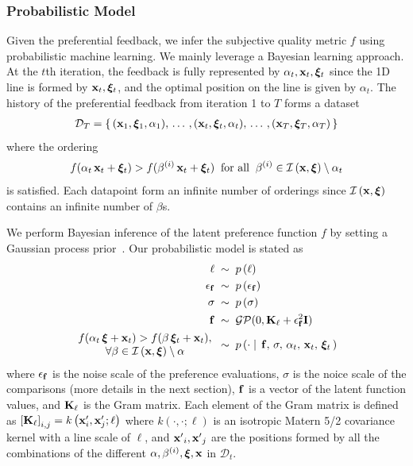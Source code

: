 \subsubsection{Probabilistic Model}
Given the preferential feedback, we infer the subjective quality metric \(f\) using probabilistic machine learning.
We mainly leverage a Bayesian learning approach.
At the \(t\)th iteration, the feedback is fully represented by \(\alpha_t, \mathbf{x}_t, \bm{\xi}_t\) since the 1D line is formed by \(\mathbf{x}_t, \bm{\xi}_t\), and the optimal position on the line is given by \(\alpha_t\).
The history of the preferential feedback from iteration 1 to \(T\) forms a dataset
%
\begin{align}
  \mathcal{D}_T = \{\,(\mathbf{x}_1, \bm{\xi}_1, \alpha_1),\, \ldots\,, (\mathbf{x}_t, \bm{\xi}_t, \alpha_t),\,\ldots\,, (\mathbf{x}_T, \bm{\xi}_T, \alpha_T) \,\}
\end{align}
%
where the ordering
\begin{align}
f(\alpha_t\,\mathbf{x}_t + \bm{\xi}_t ) > f(\beta^{(i)}\,\mathbf{x}_t + \bm{\xi}_t) \;\;\text{for all}\;\; \beta^{(i)} \in \mathcal{I}\left(\mathbf{x}, \bm{\xi}\right) \setminus \alpha_t \label{eq:likelihood}
\end{align}
is satisfied.
Each datapoint form an infinite number of orderings since \(\mathcal{I}\left(\mathbf{x}, \bm{\xi}\right)\) contains an infinite number of \(\beta\)s.

We perform Bayesian inference of the latent preference function \(f\) by setting a Gaussian process prior~\cite{rasmussen_gaussian_2006}.
Our probabilistic model is stated as 
%
\begin{align}
\ell          \;&\sim \; p\,(\ell) \nonumber\\
\epsilon_{\mathbf{f}} \;&\sim \; p\,(\epsilon_{\mathbf{f}}) \nonumber\\
\sigma        \;&\sim \; p\,(\sigma) \nonumber\\
\mathbf{f}           \;&\sim \; \mathcal{GP}(0, \mathbf{K}_{\ell} + \epsilon_{\mathbf{f}}^2\mathbf{I}) \nonumber\\
\begin{matrix}
\; f(\alpha_t\,\bm{\xi} + \mathbf{x}_t) > f(\beta\,\bm{\xi}_t + \mathbf{x}_t), \; \\
\; \forall\beta \in \mathcal{I}\left(\mathbf{x}, \bm{\xi}\right) \setminus \alpha \;
\end{matrix}\; &\sim \; p\left(\cdot \mid\, \mathbf{f},\, \sigma,\, \alpha_t,\, \mathbf{x}_t,\, \bm{\xi}_t\,\right) \nonumber 
\end{align}
%
{\noindent}where \(\epsilon_{\mathbf{f}}\) is the noise scale of the preference evaluations, \(\sigma\) is the noice scale of the comparisons (more details in the next section), \(\mathbf{f}\) is a vector of the latent function values, and \(\mathcal{\mathbf{K}}_{\ell}\) is the Gram matrix.
Each element of the Gram matrix is defined as
\(
  {[\mathbf{K}_{\ell}]}_{i,j} = k\left(\mathbf{x}^\prime_i, \mathbf{x}^\prime_j; \ell \right)
\)
where \(k\left(\cdot, \cdot; \ell \right)\) is an isotropic Matern 5/2 covariance kernel with a line scale of \(\ell\), and \({\mathbf{x}^\prime}_i, {\mathbf{x}^\prime}_j\) are the positions formed by all the combinations of the different \(\alpha, \beta^{(i)}, \bm{\xi}, \mathbf{x}\) in \(\mathcal{D}_t\).

